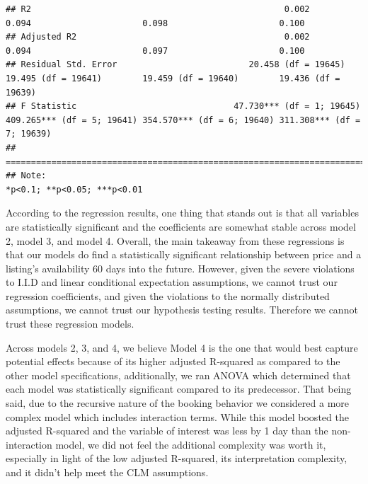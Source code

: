 \documentclass[
]{article}
\begin{document}
\begin{verbatim}
## R2                                                  0.002                     0.094                      0.098                      0.100           
## Adjusted R2                                         0.002                     0.094                      0.097                      0.100           
## Residual Std. Error                          20.458 (df = 19645)       19.495 (df = 19641)        19.459 (df = 19640)        19.436 (df = 19639)    
## F Statistic                               47.730*** (df = 1; 19645) 409.265*** (df = 5; 19641) 354.570*** (df = 6; 19640) 311.308*** (df = 7; 19639)
## ====================================================================================================================================================
## Note:                                                                                                                    *p<0.1; **p<0.05; ***p<0.01
\end{verbatim}

According to the regression results, one thing that stands out is that all variables are statistically significant and the coefficients are somewhat stable across model 2, model 3, and model 4. Overall, the main takeaway from these regressions is that our models do find a statistically significant relationship between price and a listing's availability 60 days into the future. However, given the severe violations to I.I.D and linear conditional expectation assumptions, we cannot trust our regression coefficients, and given the violations to the normally distributed assumptions, we cannot trust our hypothesis testing results. Therefore we cannot trust these regression models.

Across models 2, 3, and 4, we believe Model 4 is the one that would best capture potential effects because of its higher adjusted R-squared as compared to the other model specifications, additionally, we ran ANOVA which determined that each model was statistically significant compared to its predecessor. That being said, due to the recursive nature of the booking behavior we considered a more complex model which includes interaction terms. While this model boosted the adjusted R-squared and the variable of interest was less by 1 day than the non-interaction model, we did not feel the additional complexity was worth it, especially in light of the low adjusted R-squared, its interpretation complexity, and it didn't help meet the CLM assumptions.
\end{document}
